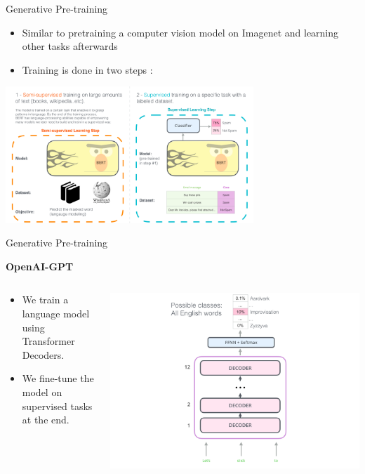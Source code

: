 \documentclass[aspectratio=169]{beamer}
\begin{document}
\begin{frame}{Generative Pre-training}
\begin{itemize}
	\item Similar to pretraining a computer vision model on Imagenet and learning other tasks afterwards
	\item Training is done in two steps :
\end{itemize}

\centering

\includegraphics[width=0.7\textwidth]{figures/bert-transfer-learning}

\end{frame}

\begin{frame}{Generative Pre-training}
\centering

\textbf{OpenAI-GPT \cite{radford2018improving}}

\begin{columns}
\begin{column}{0.5\textwidth}
\begin{itemize}
	\item We train a language model using Transformer Decoders.
	\item We fine-tune the model on supervised tasks at the end.
\end{itemize}
   
\end{column}
\begin{column}{0.5\textwidth}  %
    \centering

\includegraphics[width=\textwidth]{figures/openai-transformer-language-modeling}

\end{column}
\end{columns}
\end{frame}
\end{document}
